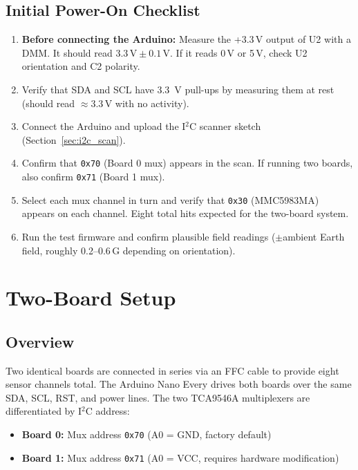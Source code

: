 \documentclass[12pt]{article}
\begin{document}
\subsection{Initial Power-On Checklist}

\begin{enumerate}
  \item \textbf{Before connecting the Arduino:} Measure the +3.3\,V output
        of U2 with a DMM. It should read $3.3\,\text{V} \pm 0.1\,\text{V}$.
        If it reads 0\,V or 5\,V, check U2 orientation and C2 polarity.
  \item Verify that SDA and SCL have \SI{3.3}{\volt} pull-ups by measuring
        them at rest (should read $\approx3.3\,\text{V}$ with no activity).
  \item Connect the Arduino and upload the I$^2$C scanner sketch
        (Section~\ref{sec:i2c_scan}).
  \item Confirm that \texttt{0x70} (Board 0 mux) appears in the scan.
        If running two boards, also confirm \texttt{0x71} (Board 1 mux).
  \item Select each mux channel in turn and verify that \texttt{0x30}
        (MMC5983MA) appears on each channel. Eight total hits expected
        for the two-board system.
  \item Run the test firmware and confirm plausible field readings
        ($\pm$ambient Earth field, roughly 0.2--0.6\,G depending on
        orientation).
\end{enumerate}

\newpage
\section{Two-Board Setup}
\label{sec:twoboard}

\subsection{Overview}

Two identical boards are connected in series via an FFC cable to provide
eight sensor channels total. The Arduino Nano Every drives both boards over
the same SDA, SCL, RST, and power lines. The two TCA9546A multiplexers are
differentiated by I$^2$C address:

\begin{itemize}
  \item \textbf{Board 0:} Mux address \texttt{0x70} (A0 = GND,
        factory default)
  \item \textbf{Board 1:} Mux address \texttt{0x71} (A0 = VCC,
        requires hardware modification)
\end{itemize}
\end{document}
